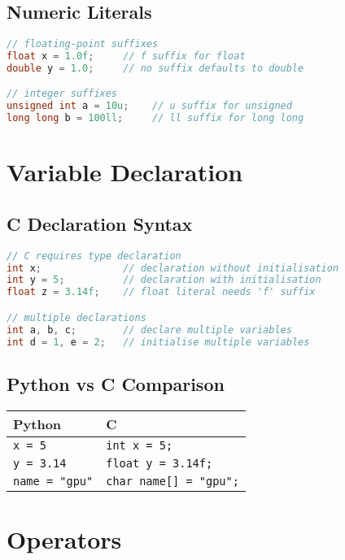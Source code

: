 \documentclass[11pt, a4paper]{article}
\newcommand{\code}[1]{\texttt{#1}}
\begin{document}
\subsection*{Numeric Literals}

\begin{lstlisting}[language=C]
// floating-point suffixes
float x = 1.0f;     // f suffix for float
double y = 1.0;     // no suffix defaults to double

// integer suffixes
unsigned int a = 10u;    // u suffix for unsigned
long long b = 100ll;     // ll suffix for long long
\end{lstlisting}

\section*{Variable Declaration}

\subsection*{C Declaration Syntax}

\begin{lstlisting}[language=C]
// C requires type declaration
int x;              // declaration without initialisation
int y = 5;          // declaration with initialisation
float z = 3.14f;    // float literal needs 'f' suffix

// multiple declarations
int a, b, c;        // declare multiple variables
int d = 1, e = 2;   // initialise multiple variables
\end{lstlisting}

\subsection*{Python vs C Comparison}

\begin{center}
\begin{tabular}{ll}
\toprule
Python & C \\
\midrule
\code{x = 5} & \code{int x = 5;} \\
\code{y = 3.14} & \code{float y = 3.14f;} \\
\code{name = "gpu"} & \code{char name[] = "gpu";} \\
\bottomrule
\end{tabular}
\end{center}

\section*{Operators}
\end{document}
